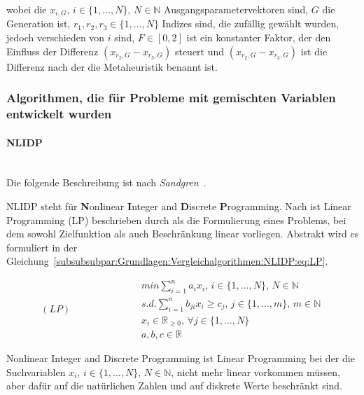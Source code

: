 \documentclass[fontsize=12, a4aper]{scrartcl}
\begin{document}
	wobei die \(x_{i, G}, \, i \in \{1, \dots, N\}, \, N \in \mathbb{N}\) Ausgangsparametervektoren sind, \(G\) die Generation ist, \(r_1, r_2, r_3 \in \{1, \dots, N\}\) Indizes sind, die zufällig gewählt wurden, jedoch verschieden von \(i\) sind, \(F \in [0, 2]\) ist ein konstanter Faktor, der den Einfluss der Differenz \((x_{r_2, G} - x_{r_3, G})\) steuert und \((x_{r_2, G} - x_{r_3, G})\) ist die Differenz nach der die Metaheuristik benannt ist. 
	
	\subsubsection{Algorithmen, die für Probleme mit gemischten Variablen entwickelt wurden}
	
	\paragraph{NLIDP}\mbox{}\\
	
	Die folgende Beschreibung ist nach \textit{Sandgren}~\cite{sandgren1990nonlinear}.\hfill\newline
	
	NLIDP steht für \textbf{N}on\textbf{l}inear \textbf{I}nteger and \textbf{D}iscrete \textbf{P}rogramming. Nach \cite{martin1985reduced} ist Linear Programming (LP) beschrieben durch als die Formulierung eines Problems, bei dem sowohl Zielfunktion als auch Beschränkung linear vorliegen. Abstrakt wird es formuliert in der Gleichung~\ref{subsubsubpar:Grundlagen:Vergleichalgorithmen:NLIDP:eq:LP}.
	
	\begin{equation} \label{subsubsubpar:Grundlagen:Vergleichalgorithmen:NLIDP:eq:LP}
		(LP) \qquad \qquad \qquad
		\begin{aligned}
			& min \sum\limits_{i = 1}^n a_i x_i, \, i \in \{1, \dots, N\}, \, N \in \mathbb{N}\\
			& s.d. \sum\limits_{i = 1}^n b_{ji} x_i \geq c_j, \, j \in \{1, \dots, m\}, \, m \in \mathbb{N}\\
			& x_i \in \mathbb{R}_{\geq 0}, \, \forall j \in \{1, \dots, N\}\\
			& a, b, c \in \mathbb{R}
		\end{aligned}
	\end{equation}
	
	Nonlinear Integer and Discrete Programming ist Linear Programming bei der die Suchvariablen \(x_i, \, i \in \{1, \dots, N\}, \, N \in \mathbb{N}\), nicht mehr linear vorkommen müssen, aber dafür auf die natürlichen Zahlen und auf diskrete Werte beschränkt sind.
\end{document}
